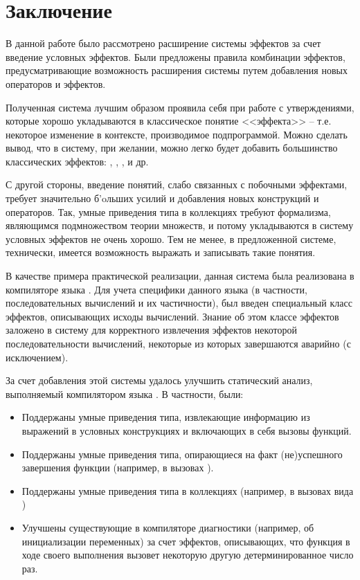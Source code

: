 \section*{Заключение}

В данной работе было рассмотрено расширение системы эффектов за счет введение условных эффектов. Были предложены правила комбинации эффектов, предусматривающие возможность расширения системы путем добавления новых операторов и эффектов. 

Полученная система лучшим образом проявила себя при работе с утверждениями, которые хорошо укладываются в классическое понятие <<эффекта>> -- т.е. некоторое изменение в контексте, производимое подпрограммой. Можно сделать вывод, что в систему, при желании, можно легко будет добавить большинство классических эффектов: , , , и др. 

С другой стороны, введение понятий, слабо связанных с побочными эффектами, требует значительно б\a'{o}льших усилий и добавления новых конструкций и операторов. Так, умные приведения типа в коллекциях требуют формализма, являющимся подмножеством теории множеств, и потому укладываются в систему условных эффектов не очень хорошо. Тем не менее, в предложенной системе, технически, имеется возможность выражать и записывать такие понятия.

В качестве примера практической реализации, данная система была реализована в компиляторе языка . Для учета специфики данного языка (в частности, последовательных вычислений и их частичности), был введен специальный класс эффектов, описывающих исходы вычислений. Знание об этом классе эффектов заложено в систему для корректного извлечения эффектов некоторой последовательности вычислений, некоторые из которых завершаются аварийно (с исключением).

За счет добавления этой системы удалось улучшить статический анализ, выполняемый компилятором языка . В частности, были:

\begin{itemize}
	\item Поддержаны умные приведения типа, извлекающие информацию из выражений в условных конструкциях и включающих в себя вызовы функций.
	
	\item Поддержаны умные приведения типа, опирающиеся на факт (не)успешного завершения функции (например, в вызовах ). 
	
	\item Поддержаны умные приведения типа в коллекциях (например, в вызовах вида )
	
	\item Улучшены существующие в компиляторе диагностики (например, об инициализации переменных) за счет эффектов, описывающих, что функция в ходе своего выполнения вызовет некоторую другую детерминированное число раз. 
\end{itemize}

